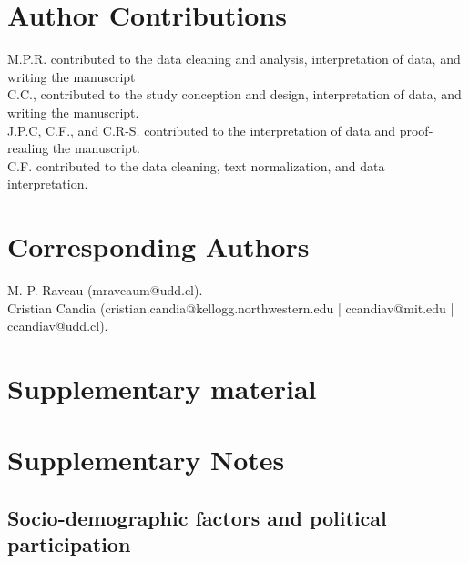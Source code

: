 \documentclass[onecolumn]{article}
\newcommand{\beginsupplement}{%
        \setcounter{table}{0}
        \renewcommand{\thetable}{S\arabic{table}}%
        \setcounter{figure}{0}
        \renewcommand{\thefigure}{S\arabic{figure}}%
        \setcounter{equation}{0}
        \renewcommand{\theequation}{S\arabic{equation}}%
        \setcounter{section}{0}
        \renewcommand{\thesection}{S\arabic{section}}%
     }
\begin{document}
\section*{Author Contributions}
M.P.R. contributed to the data cleaning and analysis, interpretation of data, and writing the manuscript\\
C.C., contributed to the study conception and design, interpretation of data, and writing the manuscript.\\
J.P.C, C.F., and C.R-S. contributed to the interpretation of data and proof-reading the manuscript.\\
C.F. contributed to the data cleaning, text normalization, and data interpretation.

\section*{Corresponding Authors}
M. P. Raveau (mraveaum@udd.cl).\\
Cristian Candia (cristian.candia@kellogg.northwestern.edu | ccandiav@mit.edu | ccandiav@udd.cl). 







\pagebreak
\clearpage



\setcounter{page}{1}
\beginsupplement

\section*{Supplementary material}

\section{Supplementary Notes}

\subsection{Socio-demographic factors and political participation}\label{SN1}
\end{document}
